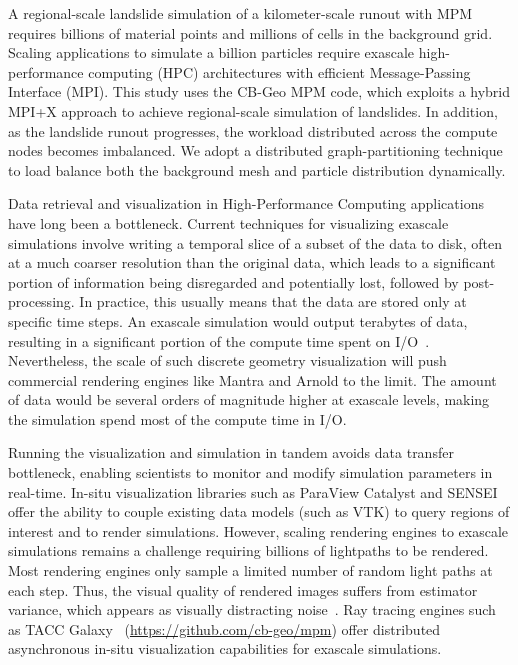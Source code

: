 \documentclass[journal]{IEEEtran}
\begin{document}
A regional-scale landslide simulation of a kilometer-scale runout with MPM requires billions of material points and millions of cells in the background grid. Scaling applications to simulate a billion particles require exascale high-performance computing (HPC) architectures with efficient Message-Passing Interface (MPI). This study uses the CB-Geo MPM code, which exploits a hybrid MPI+X approach to achieve regional-scale simulation of landslides. In addition, as the landslide runout progresses, the workload distributed across the compute nodes becomes imbalanced. We adopt a distributed graph-partitioning technique to load balance both the background mesh and particle distribution dynamically.

Data retrieval and visualization in High-Performance Computing applications have long been a bottleneck. Current techniques for visualizing exascale simulations involve writing a temporal slice of a subset of the data to disk, often at a much coarser resolution than the original data, which leads to a significant portion of information being disregarded and potentially lost, followed by post-processing. In practice, this usually means that the data are stored only at specific time steps. An exascale simulation would output terabytes of data, resulting in a significant portion of the compute time spent on I/O~\cite{byna2020exahdf5}. Nevertheless, the scale of such discrete geometry visualization will push commercial rendering engines like Mantra and Arnold to the limit. The amount of data would be several orders of magnitude higher at exascale levels, making the simulation spend most of the compute time in I/O.

Running the visualization and simulation in tandem avoids data transfer bottleneck, enabling scientists to monitor and modify simulation parameters in real-time. In-situ visualization libraries such as ParaView Catalyst and SENSEI offer the ability to couple existing data models (such as VTK) to query regions of interest and to render simulations. However, scaling rendering engines to exascale simulations remains a challenge requiring billions of lightpaths to be rendered. Most rendering engines only sample a limited number of random light paths at each step. Thus, the visual quality of rendered images suffers from estimator variance, which appears as visually distracting noise~\cite{yang2021foveated}. Ray tracing engines such as TACC Galaxy~\cite{abram2018galaxy} (\url{https://github.com/cb-geo/mpm}) offer distributed asynchronous in-situ visualization capabilities for exascale simulations. 
\end{document}
